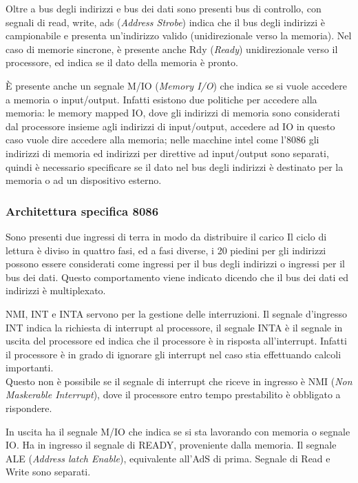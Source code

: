\documentclass[../template]{subfiles}
\begin{document}
Oltre a bus degli indirizzi e bus dei dati sono presenti bus di controllo, con segnali di read, write, ads (\textit{Address Strobe}) indica che il bus degli indirizzi è campionabile e presenta un'indirizzo valido (unidirezionale verso la memoria).
Nel caso di memorie sincrone, è presente anche Rdy (\textit{Ready}) unidirezionale verso il processore, ed indica se il dato della memoria è pronto.

È presente anche un segnale M/IO  (\textit{Memory I/O}) che indica se si vuole accedere a memoria o input/output.
Infatti esistono due politiche per accedere alla memoria: le memory mapped IO, dove gli indirizzi di memoria sono considerati dal processore insieme agli indirizzi di input/output, accedere ad IO in questo caso vuole dire accedere alla memoria; nelle macchine intel come l'8086 gli indirizzi di memoria ed indirizzi per direttive ad input/output sono separati, quindi è necessario specificare se il dato nel bus degli indirizzi è destinato per la memoria o ad un dispositivo esterno.

\subsubsection{Architettura specifica 8086}
Sono presenti due ingressi di terra in modo da distribuire il carico
Il ciclo di lettura è diviso in quattro fasi, ed a fasi diverse, i 20 piedini per gli indirizzi possono essere considerati come ingressi per il bus degli indirizzi o ingressi per il bus dei dati. Questo comportamento viene indicato dicendo che il bus dei dati ed indirizzi è multiplexato.

NMI, INT e INTA servono per la gestione delle interruzioni. Il segnale d'ingresso INT indica la richiesta di interrupt al processore, il segnale INTA è il segnale in uscita del processore ed indica che il processore è in risposta all'interrupt.
Infatti il processore è in grado di ignorare gli interrupt nel caso stia effettuando calcoli importanti.
\\
Questo non è possibile se il segnale di interrupt che riceve in ingresso è NMI (\textit{Non Maskerable Interrupt}), dove il processore entro tempo prestabilito è obbligato a rispondere.

In uscita ha il segnale M/IO che indica se si sta lavorando con memoria o segnale IO.
Ha in ingresso il segnale di READY, proveniente dalla memoria.
Il segnale ALE (\textit{Address latch Enable}), equivalente all'AdS di prima. Segnale di Read e Write sono separati.
\end{document}
